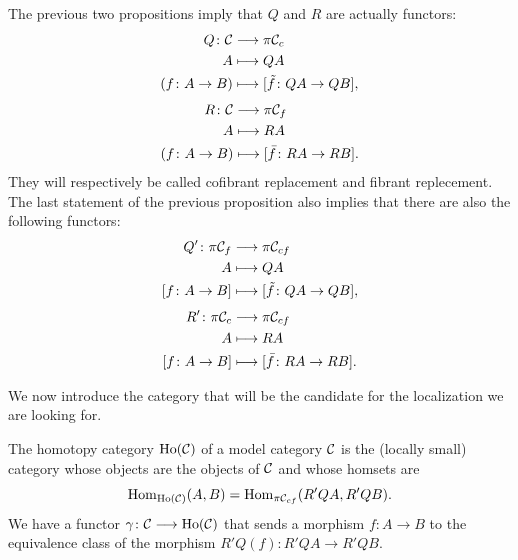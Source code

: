 \begin{remark}
	The previous two propositions imply that $Q$ and $R$ are actually functors:
	\begin{align*}
		Q \colon \mathcal{C} &\longrightarrow  \pi \mathcal{C}_c \\
		A &\longmapsto QA \\
		(f \colon A \to B) &\longmapsto [\tilde f \colon QA \to QB],
	\end{align*}
	\begin{align*}
		R \colon \mathcal{C} &\longrightarrow \pi \mathcal{C}_f \\
		A &\longmapsto RA \\
		(f \colon A \to B) &\longmapsto [\bar{f} \colon RA \to RB].
	\end{align*}
	They will respectively be called cofibrant replacement and fibrant replecement. 
	The last statement of the previous proposition also implies that there are also the following functors:
	\begin{align*}
		Q' \colon \pi \mathcal{C}_f &\longrightarrow \pi \mathcal{C}_{cf} \\
		A &\longmapsto QA \\
		[f \colon A \to B] &\longmapsto [\tilde f \colon QA \to QB],
	\end{align*}
	\begin{align*}
		R' \colon \pi \mathcal{C}_c &\longrightarrow \pi \mathcal{C}_{cf} \\
		A &\longmapsto RA \\
		[f \colon A \to B] &\longmapsto [\bar{f} \colon RA \to RB].
	\end{align*}
\end{remark}

We now introduce the category that will be the candidate for the localization we are looking for.

\begin{definition}
	The homotopy category $\mathrm{Ho}(\mathcal{C})$ of a model category $\mathcal{C}$ is the (locally small) category whose objects are the objects of $\mathcal{C}$ and whose homsets are
	\[\mathrm{Hom}_{\mathrm{Ho}(\mathcal{C})}(A,B) = \mathrm{Hom}_{\pi \mathcal{C}_{cf}}(R'QA, R'QB).\]
	We have a functor $\gamma \colon \mathcal{C} \longrightarrow \mathrm{Ho}(\mathcal{C})$ that sends a morphism $f \colon  A \longrightarrow B$ to the equivalence class of the morphism $R'Q(f)\colon R'QA \longrightarrow R'QB$.
\end{definition}

